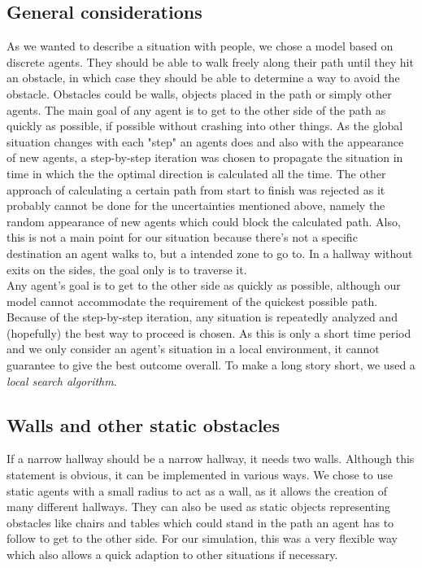 
\subsection{General considerations}
As we wanted to describe a situation with people, we chose a model based on discrete agents. They should be able to walk freely along their path until they hit an obstacle, in which case they should be able to determine a way to avoid the obstacle. Obstacles could be walls, objects placed in the path or simply other agents. The main goal of any agent is to get to the other side of the path as quickly as possible, if possible without crashing into other things. As the global situation changes with each "step" an agents does and also with the appearance of new agents, a step-by-step iteration was chosen to propagate the situation in time in which the the optimal direction is calculated all the time. The other approach of calculating a certain path from start to finish was rejected as it probably cannot be done for the uncertainties mentioned above, namely the random appearance of new agents which could block the calculated path. Also, this is not a main point for our situation because there's not a specific destination an agent walks to, but a intended zone to go to. In a hallway without exits on the sides, the goal only is to traverse it.\\
Any agent's goal is to get to the other side as quickly as possible, although our model cannot accommodate the requirement of the quickest possible path. Because of the step-by-step iteration, any situation is repeatedly analyzed and (hopefully) the best way to proceed is chosen. As this is only a short time period and we only consider an agent's situation in a local environment, it cannot guarantee to give the best outcome overall. To make a long story short, we used a \textit{local search algorithm}.

\subsection{Walls and other static obstacles}
If a narrow hallway should be a narrow hallway, it needs two walls. Although this statement is obvious, it can be implemented in various ways. We chose to use static agents with a small radius to act as a wall, as it allows the creation of many different hallways. They can also be used as static objects representing obstacles like chairs and tables which could stand in the path an agent has to follow to get to the other side. For our simulation, this was a very flexible way which also allows a quick adaption to other situations if necessary.

